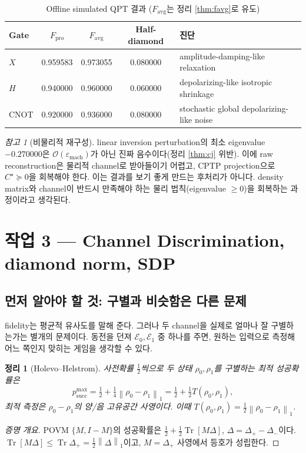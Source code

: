 \documentclass[11pt,a4paper]{article}
\newcommand{\E}{\mathcal{E}}
\newcommand{\Tr}{\operatorname{Tr}}
\newcommand{\onenorm}[1]{\left\lVert #1 \right\rVert_{1}}
\theoremstyle{definition}
\theoremstyle{plain}
\newtheorem{theorem}{정리}[section]
\theoremstyle{remark}
\newtheorem*{remark}{참고}
\begin{document}
\begin{table}[H]
\centering\small
\caption{Offline simulated QPT 결과 ($F_{\mathrm{avg}}$는 정리 \ref{thm:favg}로 유도)}
\label{tab:qpt-results}
\begin{tabularx}{\textwidth}{lcccX}
\toprule
Gate & $F_{\mathrm{pro}}$ & $F_{\mathrm{avg}}$ & Half-diamond & 진단 \\
\midrule
$X$ & 0.959583 & 0.973055 & 0.080000 & amplitude-damping-like relaxation \\
$H$ & 0.940000 & 0.960000 & 0.060000 & depolarizing-like isotropic shrinkage \\
CNOT & 0.920000 & 0.936000 & 0.080000 & stochastic global depolarizing-like noise \\
\bottomrule
\end{tabularx}
\end{table}

\begin{remark}[비물리적 재구성]
linear inversion perturbation의 최소 eigenvalue $-0.270000$은 $\mathcal O(\varepsilon_{\mathrm{mach}})$가 아닌 진짜 음수이다(정리 \ref{thm:cj} 위반). 이에 raw reconstruction은 물리적 channel로 받아들이기 어렵고, CPTP projection으로 $C^\star\succeq0$을 회복해야 한다. 이는 결과를 보기 좋게 만드는 후처리가 아니다. density matrix와 channel이 반드시 만족해야 하는 물리 법칙(eigenvalue $\ge0$)을 회복하는 과정이라고 생각된다.
\end{remark}

\section{작업 3 --- Channel Discrimination, diamond norm, SDP}

\subsection{먼저 알아야 할 것: 구별과 비슷함은 다른 문제}

fidelity는 평균적 유사도를 말해 준다. 그러나 두 channel을 실제로 얼마나 잘 구별하는가는 별개의 문제이다. 동전을 던져 $\E_0,\E_1$ 중 하나를 주면, 원하는 입력으로 측정해 어느 쪽인지 맞히는 게임을 생각할 수 있다.

\begin{theorem}[Holevo--Helstrom]\label{thm:helstrom}
사전확률 $\tfrac12$씩으로 두 상태 $\rho_0,\rho_1$를 구별하는 최적 성공확률은
\[
p_{\mathrm{succ}}^{\max}=\tfrac12+\tfrac14\onenorm{\rho_0-\rho_1}=\tfrac12+\tfrac12T(\rho_0,\rho_1),
\]
최적 측정은 $\rho_0-\rho_1$의 양/음 고유공간 사영이다. 이때 $T(\rho_0,\rho_1)=\tfrac12\onenorm{\rho_0-\rho_1}$.
\end{theorem}
\begin{proof}[증명 개요]
POVM $\{M,I-M\}$의 성공확률은 $\tfrac12+\tfrac12\Tr[M\Delta]$, $\Delta=\Delta_+-\Delta_-$이다. $\Tr[M\Delta]\le\Tr\Delta_+=\tfrac12\onenorm\Delta$이고, $M=\Delta_+$ 사영에서 등호가 성립한다.
\end{proof}
\end{document}
